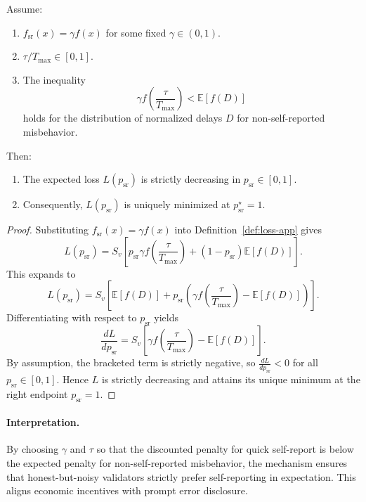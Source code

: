 \documentclass[11pt]{article}
\begin{document}
\begin{lemma}
\label{lem:self-report-app}
Assume:
\begin{enumerate}[leftmargin=*]
  \item \(f_{\mathrm{sr}}(x) = \gamma f(x)\) for some fixed \(\gamma \in (0,1)\).
  \item \(\tau/T_{\max} \in [0,1]\).
  \item The inequality
  \[
  \gamma f\!\left(\frac{\tau}{T_{\max}}\right) < \mathbb{E}[f(D)]
  \]
  holds for the distribution of normalized delays \(D\) for non-self-reported misbehavior.
\end{enumerate}
Then:
\begin{enumerate}[leftmargin=*]
  \item The expected loss \(L(p_{\mathrm{sr}})\) is strictly decreasing in \(p_{\mathrm{sr}}\in[0,1]\).
  \item Consequently, \(L(p_{\mathrm{sr}})\) is uniquely minimized at \(p_{\mathrm{sr}}^\star = 1\).
\end{enumerate}
\end{lemma}

\begin{proof}
Substituting \(f_{\mathrm{sr}}(x)=\gamma f(x)\) into Definition~\ref{def:loss-app} gives
\[
L(p_{\mathrm{sr}})
= S_v\left[
  p_{\mathrm{sr}} \gamma f\!\left(\frac{\tau}{T_{\max}}\right)
  + (1-p_{\mathrm{sr}})\mathbb{E}[f(D)]
\right].
\]
This expands to
\[
L(p_{\mathrm{sr}})
= S_v\left[
  \mathbb{E}[f(D)]
  + p_{\mathrm{sr}}\left(
    \gamma f\!\left(\frac{\tau}{T_{\max}}\right)
    - \mathbb{E}[f(D)]
  \right)
\right].
\]
Differentiating with respect to \(p_{\mathrm{sr}}\) yields
\[
\frac{dL}{dp_{\mathrm{sr}}}
= S_v\left[
  \gamma f\!\left(\frac{\tau}{T_{\max}}\right)
  - \mathbb{E}[f(D)]
\right].
\]
By assumption, the bracketed term is strictly negative, so \(\frac{dL}{dp_{\mathrm{sr}}} < 0\) for all \(p_{\mathrm{sr}}\in[0,1]\). Hence \(L\) is strictly decreasing and attains its unique minimum at the right endpoint \(p_{\mathrm{sr}} = 1\).
\end{proof}

\paragraph{Interpretation.}
By choosing \(\gamma\) and \(\tau\) so that the discounted penalty for quick self-report is below the expected penalty for non-self-reported misbehavior, the mechanism ensures that honest-but-noisy validators strictly prefer self-reporting in expectation. This aligns economic incentives with prompt error disclosure.
\end{document}
